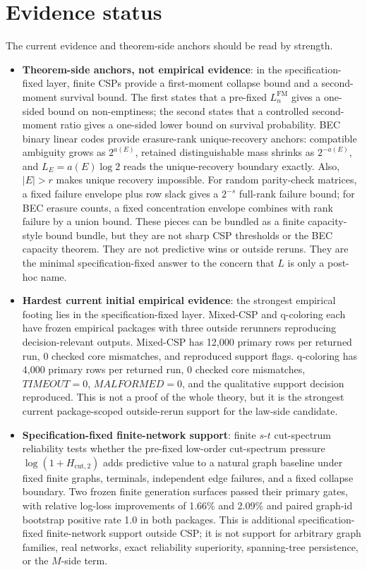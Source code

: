 \documentclass[12pt,a4paper]{article}
\begin{document}
\section{Evidence status}\label{evidence-status}

The current evidence and theorem-side anchors should be read by strength.

\begin{itemize}
\tightlist
\item
  \textbf{Theorem-side anchors, not empirical evidence}: in the specification-fixed layer, finite CSPs provide a first-moment collapse bound and a second-moment survival bound. The first states that a pre-fixed \(L_{n}^{\mathrm{FM}}\) gives a one-sided bound on non-emptiness; the second states that a controlled second-moment ratio gives a one-sided lower bound on survival probability. BEC binary linear codes provide erasure-rank unique-recovery anchors: compatible ambiguity grows as \(2^{a(E)}\), retained distinguishable mass shrinks as \(2^{-a(E)}\), and \(L_{E}=a(E)\log 2\) reads the unique-recovery boundary exactly. Also, \(|E|>r\) makes unique recovery impossible. For random parity-check matrices, a fixed failure envelope plus row slack gives a \(2^{-s}\) full-rank failure bound; for BEC erasure counts, a fixed concentration envelope combines with rank failure by a union bound. These pieces can be bundled as a finite capacity-style bound bundle, but they are not sharp CSP thresholds or the BEC capacity theorem. They are not predictive wins or outside reruns. They are the minimal specification-fixed answer to the concern that \(L\) is only a post-hoc name.
\item
  \textbf{Hardest current initial empirical evidence}: the strongest empirical footing lies in the specification-fixed layer. Mixed-CSP and q-coloring each have frozen empirical packages with three outside rerunners reproducing decision-relevant outputs. Mixed-CSP has 12,000 primary rows per returned run, 0 checked core mismatches, and reproduced support flags. q-coloring has 4,000 primary rows per returned run, 0 checked core mismatches, \(TIMEOUT = 0\), \(MALFORMED = 0\), and the qualitative support decision reproduced. This is not a proof of the whole theory, but it is the strongest current package-scoped outside-rerun support for the law-side candidate.
\item
  \textbf{Specification-fixed finite-network support}: finite \(s\)-\(t\) cut-spectrum reliability tests whether the pre-fixed low-order cut-spectrum pressure \(\log(1+H_{\mathrm{cut},2})\) adds predictive value to a natural graph baseline under fixed finite graphs, terminals, independent edge failures, and a fixed collapse boundary. Two frozen finite generation surfaces passed their primary gates, with relative log-loss improvements of 1.66\% and 2.09\% and paired graph-id bootstrap positive rate 1.0 in both packages. This is additional specification-fixed finite-network support outside CSP; it is not support for arbitrary graph families, real networks, exact reliability superiority, spanning-tree persistence, or the \(M\)-side term.

\end{itemize}
\end{document}
